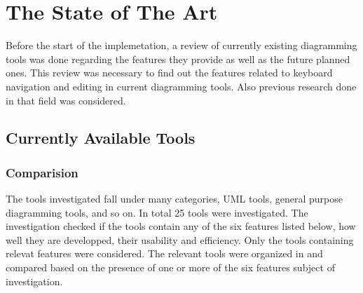 \chapter{The State of The Art}
\beginchapter
\begin{comment}
=======================================

[there are some stuff that i wrote during the research, i will try to re-use them, it's still not complete]

say that i investigated a number of tools, which type of tools, what was the investigation criteria, state the features that of the comparision criteria, meaning of $+ and -$ and put the table.

each feature, take each tool with + or ++ divide them into categories, compare the tools from the point of view of each feature together.

add conclusion @ the end\\
========================================
\end{comment}

Before the start of the implemetation, a review of currently existing diagramming tools was done regarding the features they provide as well as the future planned ones. This review was necessary to find out the features related to keyboard navigation and editing in current diagramming tools. Also previous research done in that field was considered.

\section{Currently Available Tools}
\subsection{Comparision}
The tools investigated fall under many categories, UML tools, general purpose diagramming tools, and so on. In total 25 tools were investigated. The investigation checked if the tools contain any of the six features listed below, how well they are developped, their usability and efficiency. Only the tools containing relevat features were considered. The relevant tools were organized in and compared based on the presence of one or more of the six features subject of investigation.

